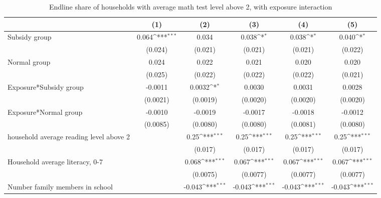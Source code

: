 \begin{table}[htbp]\centering
\def\sym#1{\ifmmode^{#1}\else\(^{#1}\)\fi}
\caption{Endline share of households with average math test level above 2, with exposure interaction}
\begin{tabular*}{1\hsize}{@{\hskip\tabcolsep\extracolsep\fill}l*{5}{c}}
\toprule
                &\multicolumn{1}{c}{(1)}         &\multicolumn{1}{c}{(2)}         &\multicolumn{1}{c}{(3)}         &\multicolumn{1}{c}{(4)}         &\multicolumn{1}{c}{(5)}         \\
\midrule
Subsidy group   &    0.064\sym{***}&    0.034         &    0.038\sym{*}  &    0.038\sym{*}  &    0.040\sym{*}  \\
                &  (0.024)         &  (0.021)         &  (0.021)         &  (0.021)         &  (0.022)         \\
Normal group    &    0.024         &    0.022         &    0.021         &    0.020         &    0.020         \\
                &  (0.025)         &  (0.022)         &  (0.022)         &  (0.022)         &  (0.021)         \\
Exposure*Subsidy group&  -0.0011         &   0.0032\sym{*}  &   0.0030         &   0.0031         &   0.0028         \\
                & (0.0021)         & (0.0019)         & (0.0020)         & (0.0020)         & (0.0020)         \\
Exposure*Normal group&  -0.0010         &  -0.0019         &  -0.0017         &  -0.0018         &  -0.0012         \\
                & (0.0085)         & (0.0080)         & (0.0080)         & (0.0081)         & (0.0080)         \\
household average reading level above 2&                  &     0.25\sym{***}&     0.25\sym{***}&     0.25\sym{***}&     0.25\sym{***}\\
                &                  &  (0.017)         &  (0.017)         &  (0.017)         &  (0.017)         \\
Household average literacy, 0-7&                  &    0.068\sym{***}&    0.067\sym{***}&    0.067\sym{***}&    0.067\sym{***}\\
                &                  & (0.0075)         & (0.0077)         & (0.0077)         & (0.0077)         \\
Number family members in school&                  &   -0.043\sym{***}&   -0.043\sym{***}&   -0.043\sym{***}&   -0.043\sym{***}\\

\end{tabular*}
\end{table}
